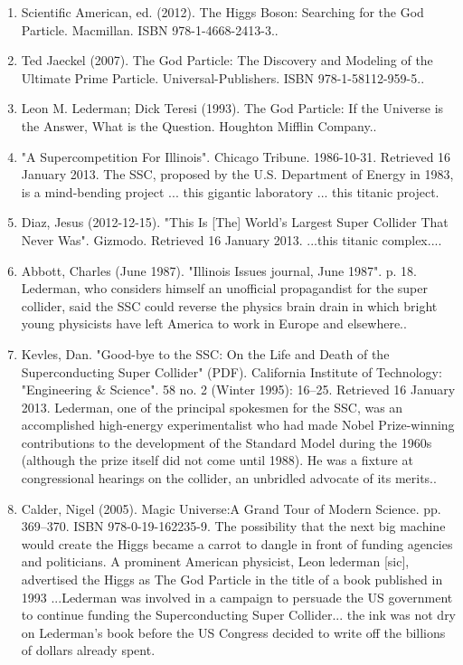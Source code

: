 \begin{enumerate}
    \item Scientific American, ed. (2012). The Higgs Boson: Searching for the God Particle. Macmillan. ISBN 978-1-4668-2413-3..
    \item Ted Jaeckel (2007). The God Particle: The Discovery and Modeling of the Ultimate Prime Particle. Universal-Publishers. ISBN 978-1-58112-959-5..
    \item Leon M. Lederman; Dick Teresi (1993). The God Particle: If the Universe is the Answer, What is the Question. Houghton Mifflin Company..
    \item "A Supercompetition For Illinois". Chicago Tribune. 1986-10-31. Retrieved 16 January 2013. The SSC, proposed by the U.S. Department of Energy in 1983, is a mind-bending project ... this gigantic laboratory ... this titanic project.
    \item Diaz, Jesus (2012-12-15). "This Is [The] World's Largest Super Collider That Never Was". Gizmodo. Retrieved 16 January 2013. ...this titanic complex....
    \item Abbott, Charles (June 1987). "Illinois Issues journal, June 1987". p. 18. Lederman, who considers himself an unofficial propagandist for the super collider, said the SSC could reverse the physics brain drain in which bright young physicists have left America to work in Europe and elsewhere..
    \item Kevles, Dan. "Good-bye to the SSC: On the Life and Death of the Superconducting Super Collider" (PDF). California Institute of Technology: "Engineering & Science". 58 no. 2 (Winter 1995): 16–25. Retrieved 16 January 2013. Lederman, one of the principal spokesmen for the SSC, was an accomplished high-energy experimentalist who had made Nobel Prize-winning contributions to the development of the Standard Model during the 1960s (although the prize itself did not come until 1988). He was a fixture at congressional hearings on the collider, an unbridled advocate of its merits..
    \item Calder, Nigel (2005). Magic Universe:A Grand Tour of Modern Science. pp. 369–370. ISBN 978-0-19-162235-9. The possibility that the next big machine would create the Higgs became a carrot to dangle in front of funding agencies and politicians. A prominent American physicist, Leon lederman [sic], advertised the Higgs as The God Particle in the title of a book published in 1993 ...Lederman was involved in a campaign to persuade the US government to continue funding the Superconducting Super Collider... the ink was not dry on Lederman's book before the US Congress decided to write off the billions of dollars already spent.

\end{enumerate}
